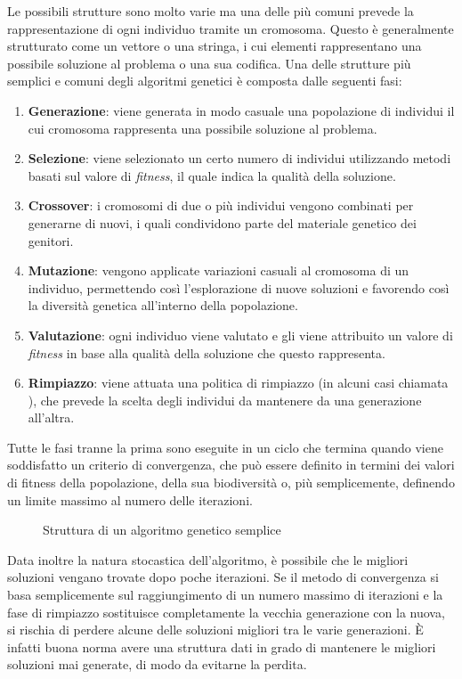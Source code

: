 Le possibili strutture sono molto varie ma una delle più comuni prevede la
rappresentazione di ogni individuo tramite un cromosoma. Questo è generalmente
strutturato come un vettore o una stringa, i cui elementi rappresentano una
possibile soluzione al problema o una sua codifica. Una delle strutture più
semplici e comuni degli algoritmi genetici è composta dalle seguenti fasi:
\begin{enumerate}
	\item \textbf{Generazione}: viene generata in modo casuale una popolazione
	      di individui il cui cromosoma rappresenta una possibile soluzione al
	      problema.
	\item \textbf{Selezione}: viene selezionato un certo numero di individui
	      utilizzando metodi basati sul valore di \textit{fitness}, il quale
	      indica la qualità della soluzione.
	\item \textbf{Crossover}: i cromosomi di due o più individui vengono
	      combinati per generarne di nuovi, i quali condividono parte del
	      materiale genetico dei genitori.
	\item \textbf{Mutazione}: vengono applicate variazioni casuali al cromosoma
	      di un individuo, permettendo così l'esplorazione di nuove soluzioni e
	      favorendo così la diversità genetica all'interno della popolazione.
	\item \textbf{Valutazione}: ogni individuo viene valutato e gli viene
	      attribuito un valore di \textit{fitness} in base alla qualità della
	      soluzione che questo rappresenta.
	\item \textbf{Rimpiazzo}: viene attuata una politica di rimpiazzo (in
	      alcuni casi chiamata ), che prevede la
	      scelta degli individui da mantenere da una generazione all'altra.
\end{enumerate}
Tutte le fasi tranne la prima sono eseguite in un ciclo che termina quando
viene soddisfatto un criterio di convergenza, che può essere definito in
termini dei valori di fitness della popolazione, della sua biodiversità o, più
semplicemente, definendo un limite massimo al numero delle iterazioni.

\begin{figure}[H]
	\centering
	
	\caption{Struttura di un algoritmo genetico semplice}
	\label{fig:simple_ga}
\end{figure}

Data inoltre la natura stocastica dell'algoritmo, è possibile che le migliori
soluzioni vengano trovate dopo poche iterazioni. Se il metodo di convergenza
si basa semplicemente sul raggiungimento di un numero massimo di iterazioni e
la fase di rimpiazzo sostituisce completamente la vecchia generazione con la
nuova, si rischia di perdere alcune delle soluzioni migliori tra le varie
generazioni. È infatti buona norma avere una struttura dati in grado di
mantenere le migliori soluzioni mai generate, di modo da evitarne la perdita.
